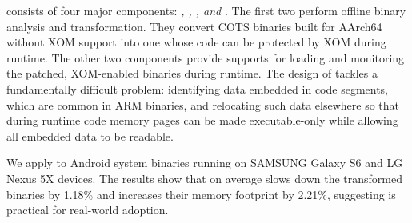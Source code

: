 
\NORAX consists of four major components: \emph{
\NDisassembler,
\NPatcher,
\NLoader,
and \NMonitor}. 
The first two perform offline binary analysis and transformation. They convert COTS binaries built for AArch64 without XOM support into one whose code can be protected by XOM during runtime. 
The other two components provide supports for loading and monitoring the patched, XOM-enabled binaries during runtime.  
The design of \NORAX tackles a fundamentally difficult problem: identifying data embedded in code segments, which are common in ARM binaries, and relocating such data elsewhere so that during runtime code memory pages can be made executable-only while allowing all embedded data to be readable. 

We apply \NORAX to Android system binaries running on
SAMSUNG Galaxy S6 and LG Nexus 5X devices. The results show that \NORAX on average slows down the transformed binaries by 1.18\% and increases their memory footprint by  2.21\%, suggesting \NORAX is practical for real-world adoption. 
